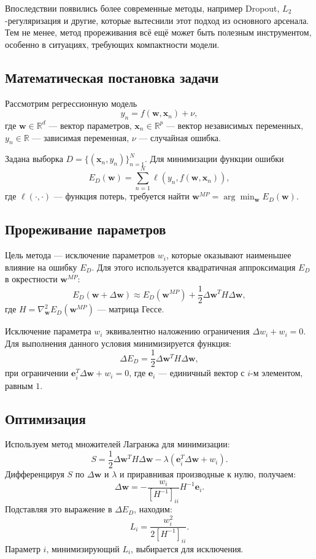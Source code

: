 Впоследствии появились более современные методы, например Dropout, $L_2$-регуляризация и другие, которые вытеснили этот подход из основного арсенала.
Тем не менее, метод прореживания всё ещё может быть полезным инструментом, особенно в ситуациях, требующих компактности модели.

\subsection*{Математическая постановка задачи}
Рассмотрим регрессионную модель 
\[
y_n = f(\mathbf{w}, \mathbf{x}_n) + \nu,
\]
где $\mathbf{w} \in \mathbb{R}^d$ — вектор параметров, $\mathbf{x}_n \in \mathbb{R}^p$ — вектор независимых переменных, $y_n \in \mathbb{R}$ — зависимая переменная, $\nu$ — случайная ошибка. 

Задана выборка $D = \{(\mathbf{x}_n, y_n)\}_{n=1}^N$. Для минимизации функции ошибки 
\[
E_D(\mathbf{w}) = \sum_{n=1}^N \ell(y_n, f(\mathbf{w}, \mathbf{x}_n)),
\]
где $\ell(\cdot, \cdot)$ — функция потерь, требуется найти $\mathbf{w}^{MP} = \arg\min_{\mathbf{w}} E_D(\mathbf{w})$. 

\subsection*{Прореживание параметров}
Цель метода — исключение параметров $w_i$, которые оказывают наименьшее влияние на ошибку $E_D$.
Для этого используется квадратичная аппроксимация $E_D$ в окрестности $\mathbf{w}^{MP}$:
\[
E_D(\mathbf{w} + \Delta\mathbf{w}) \approx E_D(\mathbf{w}^{MP}) + \frac{1}{2} \Delta\mathbf{w}^T H \Delta\mathbf{w},
\]
где $H = \nabla^2_{\mathbf{w}} E_D(\mathbf{w}^{MP})$ — матрица Гессе.

Исключение параметра $w_i$ эквивалентно наложению ограничения $\Delta w_i + w_i = 0$.
Для выполнения данного условия минимизируется функция:
\[
\Delta E_D = \frac{1}{2} \Delta\mathbf{w}^T H \Delta\mathbf{w},
\]
при ограничении $\mathbf{e}_i^T \Delta\mathbf{w} + w_i = 0$, где $\mathbf{e}_i$ — единичный вектор с $i$-м элементом, равным $1$. 

\subsection*{Оптимизация}
Используем метод множителей Лагранжа для минимизации:
\[
S = \frac{1}{2} \Delta\mathbf{w}^T H \Delta\mathbf{w} - \lambda (\mathbf{e}_i^T \Delta\mathbf{w} + w_i).
\]
Дифференцируя $S$ по $\Delta\mathbf{w}$ и $\lambda$ и приравнивая производные к нулю, получаем:
\[
\Delta\mathbf{w} = -\frac{w_i}{[H^{-1}]_{ii}} H^{-1} \mathbf{e}_i.
\]
Подставляя это выражение в $\Delta E_D$, находим:
\[
L_i = \frac{w_i^2}{2 [H^{-1}]_{ii}}.
\]
Параметр $i$, минимизирующий $L_i$, выбирается для исключения.

